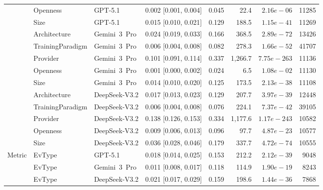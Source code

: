 \begin{table}[H]
\begin{adjustbox}{max width=\textwidth}
\begin{tabular}{llllrrrr}
 & Openness & GPT-5.1 & 0.002 [0.001, 0.004] & 0.045 & 22.4 & $2.16e-06$ & 11285 \\
 & Size & GPT-5.1 & 0.015 [0.010, 0.021] & 0.129 & 188.5 & $1.15e-41$ & 11269 \\
 & Architecture & Gemini~3~Pro & 0.024 [0.019, 0.033] & 0.166 & 368.5 & $2.89e-72$ & 13426 \\
 & TrainingParadigm & Gemini~3~Pro & 0.006 [0.004, 0.008] & 0.082 & 278.3 & $1.66e-52$ & 41707 \\
 & Provider & Gemini~3~Pro & 0.101 [0.091, 0.114] & 0.337 & 1,266.7 & $7.75e-263$ & 11136 \\
 & Openness & Gemini~3~Pro & 0.001 [0.000, 0.002] & 0.024 & 6.5 & $1.08e-02$ & 11130 \\
 & Size & Gemini~3~Pro & 0.014 [0.010, 0.020] & 0.125 & 173.5 & $2.13e-38$ & 11108 \\
 & Architecture & DeepSeek-V3.2 & 0.017 [0.013, 0.023] & 0.129 & 207.7 & $3.97e-39$ & 12448 \\
 & TrainingParadigm & DeepSeek-V3.2 & 0.006 [0.004, 0.008] & 0.076 & 224.1 & $7.37e-42$ & 39105 \\
 & Provider & DeepSeek-V3.2 & 0.138 [0.126, 0.153] & 0.334 & 1,177.6 & $1.17e-243$ & 10582 \\
 & Openness & DeepSeek-V3.2 & 0.009 [0.006, 0.013] & 0.096 & 97.7 & $4.87e-23$ & 10577 \\
 & Size & DeepSeek-V3.2 & 0.036 [0.028, 0.046] & 0.179 & 337.7 & $4.72e-74$ & 10555 \\
Metric & EvType & GPT-5.1 & 0.018 [0.014, 0.025] & 0.153 & 212.2 & $2.12e-39$ & 9048 \\
 & EvType & Gemini~3~Pro & 0.011 [0.008, 0.017] & 0.118 & 114.9 & $1.90e-19$ & 8243 \\
 & EvType & DeepSeek-V3.2 & 0.021 [0.017, 0.029] & 0.159 & 198.6 & $1.44e-36$ & 7868 \\
\bottomrule
\end{tabular}
\end{adjustbox}
\end{table}